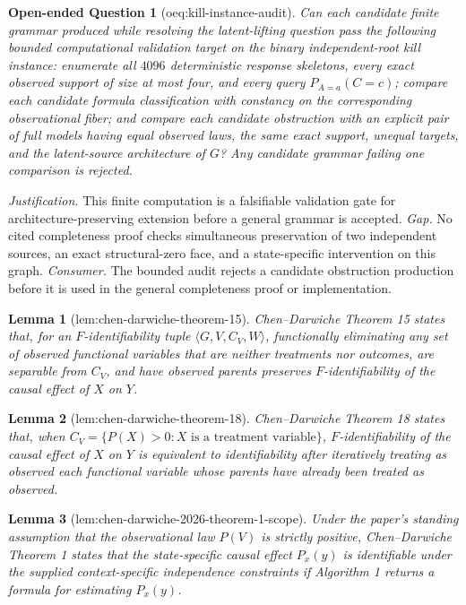 \documentclass{article}
\newtheorem{lemma}{Lemma}
\newtheorem{openendedquestion}{Open-ended Question}
\begin{document}
\begin{openendedquestion}[oeq:kill-instance-audit]\label{oeq:kill-instance-audit}
Can each candidate finite grammar produced while resolving the latent-lifting question pass the following bounded computational validation target on the binary independent-root kill instance: enumerate all \(4096\) deterministic response skeletons, every exact observed support of size at most four, and every query \(P_{A=a}(C=c)\); compare each candidate formula classification with constancy on the corresponding observational fiber; and compare each candidate obstruction with an explicit pair of full models having equal observed laws, the same exact support, unequal targets, and the latent-source architecture of \(G\)? Any candidate grammar failing one comparison is rejected.
\end{openendedquestion}
\par\smallskip\noindent \textit{Justification.} This finite computation is a falsifiable validation gate for architecture-preserving extension before a general grammar is accepted. \textit{Gap.} No cited completeness proof checks simultaneous preservation of two independent sources, an exact structural-zero face, and a state-specific intervention on this graph. \textit{Consumer.} The bounded audit rejects a candidate obstruction production before it is used in the general completeness proof or implementation.

\begin{lemma}[lem:chen-darwiche-theorem-15]\label{lem:chen-darwiche-theorem-15}
Chen--Darwiche Theorem 15 states that, for an \(F\)-identifiability tuple \(\langle G,V,C_V,W\rangle\), functionally eliminating any set of observed functional variables that are neither treatments nor outcomes, are separable from \(C_V\), and have observed parents preserves \(F\)-identifiability of the causal effect of \(X\) on \(Y\).
\end{lemma}

\begin{lemma}[lem:chen-darwiche-theorem-18]\label{lem:chen-darwiche-theorem-18}
Chen--Darwiche Theorem 18 states that, when \(C_V=\{P(X)>0:X\text{ is a treatment variable}\}\), \(F\)-identifiability of the causal effect of \(X\) on \(Y\) is equivalent to identifiability after iteratively treating as observed each functional variable whose parents have already been treated as observed.
\end{lemma}

\begin{lemma}[lem:chen-darwiche-2026-theorem-1-scope]\label{lem:chen-darwiche-2026-theorem-1-scope}
Under the paper's standing assumption that the observational law \(P(V)\) is strictly positive, Chen--Darwiche Theorem 1 states that the state-specific causal effect \(P_x(y)\) is identifiable under the supplied context-specific independence constraints if Algorithm 1 returns a formula for estimating \(P_x(y)\).
\end{lemma}
\end{document}
